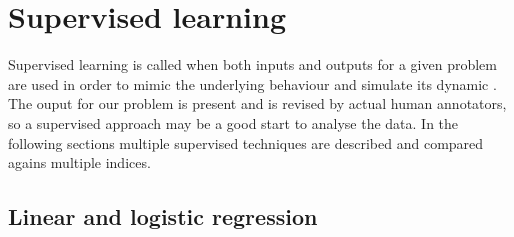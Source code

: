 \documentclass[journal]{IEEEtran}
\begin{document}
\section{Supervised learning\label{sec:supervised}} 

Supervised learning is called when both inputs and outputs for a given problem
are used in order to mimic the underlying behaviour and simulate its dynamic
\cite{supervised:definition:rusell}. The ouput for our problem is present and is
revised by actual human annotators, so a supervised approach may be a good start
to analyse the data. In the following sections multiple supervised techniques
are described and compared agains multiple indices.

\subsection{Linear and logistic regression\label{sec:regression}}
\end{document}
